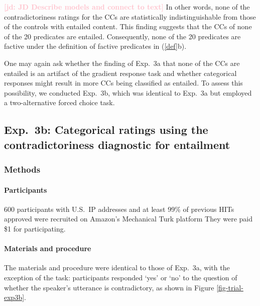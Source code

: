 \documentclass[11pt,fleqn]{article}
\newcommand{\jd}[1]{\textbf{\textcolor{Pink}{[jd: #1]}}}
\newcommand{\6}{\mbox{$[\hspace*{-.6mm}[$}}
\newcommand{\9}{\mbox{$]\hspace*{-.6mm}]$}}
\begin{document}
{\jd{JD Describe models and connect to text} In other words, none of the contradictoriness ratings for the CCs are statistically indistinguishable from those of the controls with entailed content. This finding suggests that the CCs of none of the 20 predicates are entailed. Consequently, none of the 20 predicates are factive under the definition of factive predicates in (\ref{def}b). 

One may again ask whether the finding of Exp.~3a that none of the CCs are entailed is an artifact of the gradient response task and whether categorical responses might result in more CCs being classified as entailed. To assess this possibility, we conducted Exp.~3b, which was identical to Exp.~3a but employed a two-alternative forced choice task.



\subsection{Exp.~3b: Categorical ratings using the contradictoriness diagnostic for entailment}\label{s32}

\subsubsection{Methods}

\paragraph{Participants} 600 participants with U.S.\ IP addresses and at least 99\% of previous HITs approved were recruited on Amazon's Mechanical Turk platform They were paid \$1 for participating.

\paragraph{Materials and procedure} The materials and procedure were identical to those of Exp.~3a, with the exception of the task: participants responded `yes' or `no' to the question of whether the speaker's utterance is contradictory, as shown in Figure \ref{fig-trial-exp3b}.

}
\end{document}
